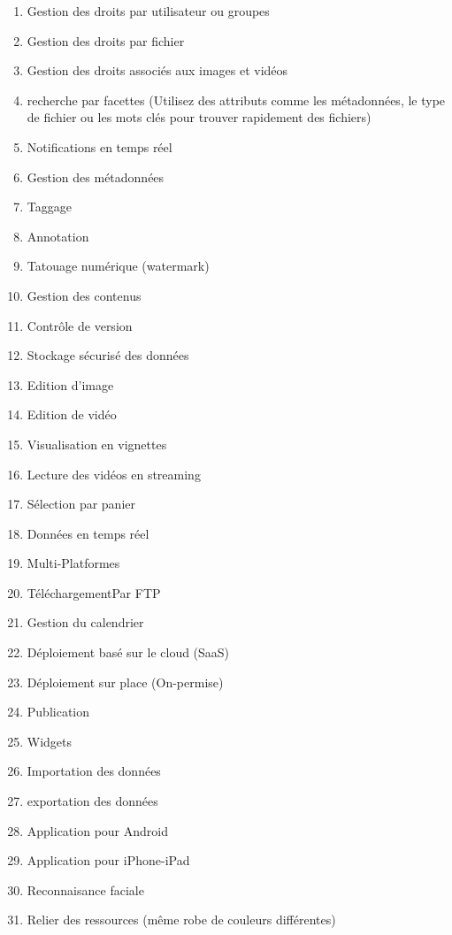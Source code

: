 \begin{enumerate}
\item Gestion des droits par utilisateur ou groupes
\item Gestion des droits par fichier 
\item  Gestion des droits associés aux images et vidéos	
\item recherche par facettes (Utilisez des attributs comme les métadonnées, le type de fichier ou les mots clés pour trouver rapidement des fichiers)
\item Notifications en temps réel
\item Gestion des métadonnées	
\item Taggage	
\item Annotation	
\item  Tatouage numérique (watermark)	
\item  Gestion des contenus	
\item Contrôle de version 
\item Stockage sécurisé des données
\item Edition d'image 
\item Edition de vidéo 
\item Visualisation en vignettes	
\item Lecture des vidéos en streaming
\item Sélection par panier
\item Données en temps réel
\item Multi-Platformes
\item TéléchargementPar FTP	
\item Gestion du calendrier
\item Déploiement basé sur le cloud (SaaS)
\item Déploiement sur place (On-permise)
\item Publication	
\item Widgets
\item Importation des données
\item exportation des données
\item Application pour Android  
\item Application pour  iPhone-iPad
\item Reconnaisance faciale
\item Relier des ressources (même robe de couleurs différentes)
\newline
\end{enumerate}

